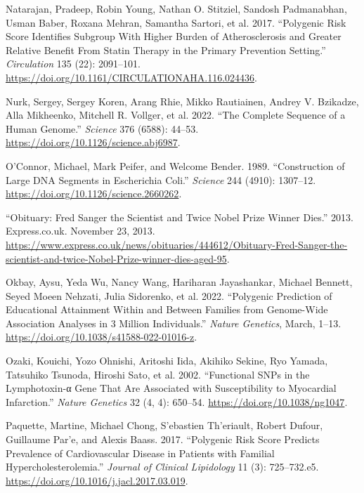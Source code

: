\documentclass[
]{book}
\newlength{\cslhangindent}
\newlength{\cslentryspacingunit} %
\newenvironment{CSLReferences}[2] %
 {%
  \setlength{\parindent}{0pt}
  \ifodd #1
  \let\oldpar\par
  \def\par{\hangindent=\cslhangindent\oldpar}
  \fi
  \setlength{\parskip}{#2\cslentryspacingunit}
 }%
 {}
\begin{document}
\begin{CSLReferences}{1}{0}
\leavevmode{}%
Natarajan, Pradeep, Robin Young, Nathan O. Stitziel, Sandosh Padmanabhan, Usman Baber, Roxana Mehran, Samantha Sartori, et al. 2017. {``Polygenic {Risk Score Identifies Subgroup With Higher Burden} of {Atherosclerosis} and {Greater Relative Benefit From Statin Therapy} in the {Primary Prevention Setting}.''} \emph{Circulation} 135 (22): 2091--101. \url{https://doi.org/10.1161/CIRCULATIONAHA.116.024436}.

\leavevmode{}%
Nurk, Sergey, Sergey Koren, Arang Rhie, Mikko Rautiainen, Andrey V. Bzikadze, Alla Mikheenko, Mitchell R. Vollger, et al. 2022. {``The Complete Sequence of a Human Genome.''} \emph{Science} 376 (6588): 44--53. \url{https://doi.org/10.1126/science.abj6987}.

\leavevmode{}%
O'Connor, Michael, Mark Peifer, and Welcome Bender. 1989. {``Construction of {Large DNA Segments} in {Escherichia} Coli.''} \emph{Science} 244 (4910): 1307--12. \url{https://doi.org/10.1126/science.2660262}.

\leavevmode{}%
{``Obituary: {Fred Sanger} the Scientist and Twice {Nobel Prize} Winner Dies.''} 2013. {Express.co.uk}. November 23, 2013. \url{https://www.express.co.uk/news/obituaries/444612/Obituary-Fred-Sanger-the-scientist-and-twice-Nobel-Prize-winner-dies-aged-95}.

\leavevmode{}%
Okbay, Aysu, Yeda Wu, Nancy Wang, Hariharan Jayashankar, Michael Bennett, Seyed Moeen Nehzati, Julia Sidorenko, et al. 2022. {``Polygenic Prediction of Educational Attainment Within and Between Families from Genome-Wide Association Analyses in 3 Million Individuals.''} \emph{Nature Genetics}, March, 1--13. \url{https://doi.org/10.1038/s41588-022-01016-z}.

\leavevmode{}%
Ozaki, Kouichi, Yozo Ohnishi, Aritoshi Iida, Akihiko Sekine, Ryo Yamada, Tatsuhiko Tsunoda, Hiroshi Sato, et al. 2002. {``Functional {SNPs} in the Lymphotoxin-α Gene That Are Associated with Susceptibility to Myocardial Infarction.''} \emph{Nature Genetics} 32 (4, 4): 650--54. \url{https://doi.org/10.1038/ng1047}.

\leavevmode{}%
Paquette, Martine, Michael Chong, S'ebastien Th'eriault, Robert Dufour, Guillaume Par'e, and Alexis Baass. 2017. {``Polygenic Risk Score Predicts Prevalence of Cardiovascular Disease in Patients with Familial Hypercholesterolemia.''} \emph{Journal of Clinical Lipidology} 11 (3): 725--732.e5. \url{https://doi.org/10.1016/j.jacl.2017.03.019}.


\end{CSLReferences}
\end{document}
